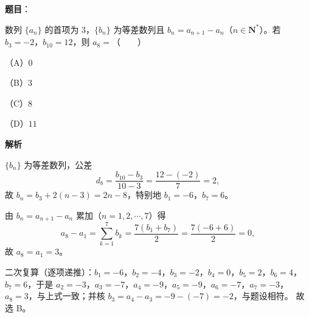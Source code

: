 \begin{answer}

\textbf{题目}：

数列 $\{a_n\}$ 的首项为 $3$，$\{b_n\}$ 为等差数列且 $b_n=a_{n+1}-a_n$（$n\in\mathbf N^*$）。若 $b_3=-2$，$b_{10}=12$，则 $a_8=$\mbox{（　　）}

（A）$0$

（B）$3$

（C）$8$

（D）$11$

\textbf{解析}

$\{b_n\}$ 为等差数列，公差
\nopagebreak[4]
\[d_b=\frac{b_{10}-b_3}{10-3}=\frac{12-(-2)}{7}=2,\]
故 $b_n=b_3+2(n-3)=2n-8$，特别地 $b_1=-6$，$b_7=6$。

由 $b_n=a_{n+1}-a_n$ 累加（$n=1,2,\cdots,7$）得
\nopagebreak[4]
\[a_8-a_1=\sum_{k=1}^{7}b_k=\frac{7(b_1+b_7)}{2}=\frac{7(-6+6)}{2}=0,\]
故 $a_8=a_1=3$。

二次复算（逐项递推）：$b_1=-6$，$b_2=-4$，$b_3=-2$，$b_4=0$，$b_5=2$，$b_6=4$，$b_7=6$，于是 $a_2=-3$，$a_3=-7$，$a_4=-9$，$a_5=-9$，$a_6=-7$，$a_7=-3$，$a_8=3$，与上式一致；并核 $b_3=a_4-a_3=-9-(-7)=-2$，与题设相符。
故选 B。


\end{answer}
